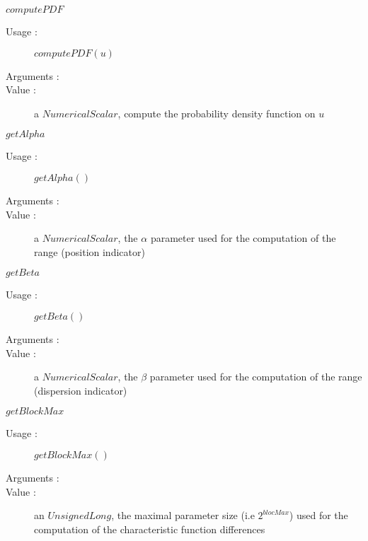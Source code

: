 \begin{description}
\begin{description}
  \item $computePDF$
    \begin{description}
    \item[Usage :]  $computePDF(u)$
    \item[Arguments :]  \strut
    \item[Value :] a $NumericalScalar$, compute the probability density function on $u$
    \end{description}

  \item $getAlpha$
    \begin{description}
    \item[Usage :]  $getAlpha()$
    \item[Arguments :]  \strut
    \item[Value :] a $NumericalScalar$, the $\alpha$ parameter used for the computation of the range (position indicator)
    \end{description}

  \item $getBeta$
    \begin{description}
    \item[Usage :]  $getBeta()$
    \item[Arguments :]  \strut
    \item[Value :] a $NumericalScalar$, the $\beta$ parameter used for the computation of the range (dispersion indicator)
    \end{description}

  \item $getBlockMax$
    \begin{description}
    \item[Usage :]  $getBlockMax()$
    \item[Arguments :]  \strut
    \item[Value :] an $UnsignedLong$, the maximal parameter size (i.e $2^{blocMax}$) used for the computation of the characteristic function differences
    \end{description}


\end{description}
\end{description}
